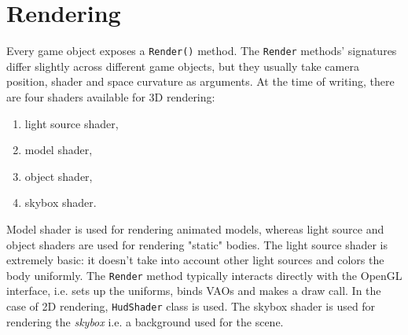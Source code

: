 \section{Rendering}
Every game object exposes a \texttt{Render()} method.
The \texttt{Render} methods' signatures differ slightly across different game objects, but they usually take camera position, shader and space curvature as arguments.
At the time of writing, there are four shaders available for 3D rendering:
\begin{enumerate}
    \item light source shader,
    \item model shader,
    \item object shader,
    \item skybox shader.
\end{enumerate}
Model shader is used for rendering animated models, whereas light source and object shaders are used for rendering "static" bodies.
The light source shader is extremely basic: it doesn't take into account other light sources and colors the body uniformly.
The \texttt{Render} method typically interacts directly with the OpenGL interface, i.e. sets up the uniforms, binds VAOs and makes a draw call.
In the case of 2D rendering, \texttt{HudShader} class is used.
The skybox shader is used for rendering the \textit{skybox} i.e. a background used for the scene.
